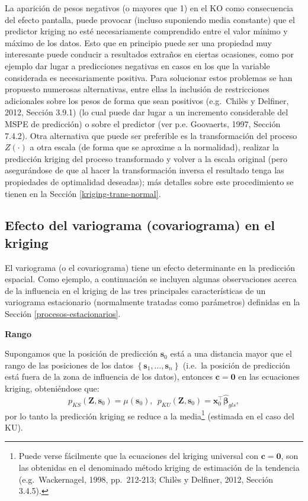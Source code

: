 \documentclass[
  spanish,
]{book}
\theoremstyle{break}
\theoremstyle{definition}
\theoremstyle{definition}
\theoremstyle{definition}
\theoremstyle{definition}
\theoremstyle{remark}
\begin{document}
La aparición de pesos negativos (o mayores que 1) en el KO como consecuencia del efecto pantalla, puede provocar (incluso suponiendo media constante) que el predictor kriging no esté necesariamente comprendido entre el valor mínimo y máximo de los datos.
Esto que en principio puede ser una propiedad muy interesante puede conducir a resultados extraños en ciertas ocasiones, como por ejemplo dar lugar a predicciones negativas en casos en los que la variable considerada es necesariamente positiva.
Para solucionar estos problemas se han propuesto numerosas alternativas, entre ellas la inclusión de restricciones adicionales sobre los pesos de forma que sean positivos (e.g.~Chilès y Delfiner, 2012, Sección 3.9.1) (lo cual puede dar lugar a un incremento considerable del MSPE de predicción) o sobre el predictor (ver p.e. Goovaerts, 1997, Sección 7.4.2).
Otra alternativa que puede ser preferible es la transformación del proceso \(Z(\cdot)\) a otra escala (de forma que se aproxime a la normalidad), realizar la predicción kriging del proceso transformado y volver a la escala original (pero asegurándose de que al hacer la transformación inversa el resultado tenga las propiedades de optimalidad deseadas); más detalles sobre este procedimiento se tienen en la Sección \ref{kriging-trans-normal}.

\hypertarget{efecto-variog-kriging}{%
\subsection{Efecto del variograma (covariograma) en el kriging}\label{efecto-variog-kriging}}

El variograma (o el covariograma) tiene un efecto determinante en la predicción espacial.
Como ejemplo, a continuación se incluyen algunas observaciones acerca de la influencia en el kriging de las tres principales características de un variograma estacionario (normalmente tratadas como parámetros) definidas en la Sección \ref{procesos-estacionarios}.

\textbf{Rango}

Supongamos que la posición de predicción \(\mathbf{s}_{0}\) está a una
distancia mayor que el rango de las posiciones de los datos \(\left\{ \mathbf{s}_{1}, \ldots,\mathbf{s}_{n} \right\}\) (i.e.~la posición de predicción está fuera de la zona de influencia de los datos), entonces \(\mathbf{c}=\mathbf{0}\) en las ecuaciones kriging, obteniéndose que:
\[p_{KS} (\mathbf{Z},\mathbf{s}_{0})=\mu(\mathbf{s}_{0}),\ \ p_{KU} (\mathbf{Z},\mathbf{s}_{0})=\mathbf{x}_0^\top\hat{\boldsymbol{\beta}}_{gls},\]
por lo tanto la predicción kriging se reduce a la media\footnote{Puede verse fácilmente que la ecuaciones del kriging universal con \(\mathbf{c}=\mathbf{0}\), son las obtenidas en el denominado método kriging de estimación de la tendencia (e.g.~Wackernagel, 1998, pp.~212-213; Chilès y Delfiner, 2012, Sección 3.4.5).} (estimada en el caso del KU).
\end{document}
